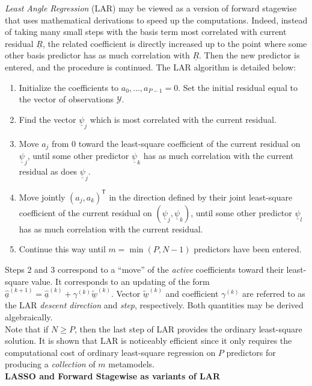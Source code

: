 {\emph{Least Angle Regression} (LAR) may be viewed as a version of forward stagewise that uses mathematical derivations to speed up the computations. Indeed, instead of taking many small steps with the basis term most correlated with current residual $\underline{R}$, the related coefficient is directly increased up to the point where some other basis predictor has as much correlation with $\underline{R}$. Then the new predictor is entered, and the procedure is continued. The LAR algorithm is detailed below:
\begin{enumerate}
	\item Initialize the coefficients to $a_{0},\dots,a_{P-1} = 0$. Set the initial residual equal to the vector of observations $\mathcal{Y}$. 
	\item Find the vector $\underline{\psi}_{j}$ which is most correlated with the current residual.
	\item Move $a_{j}$ from 0 toward the least-square coefficient of the current residual on $\underline{\psi}_{j}$, until some other predictor $\underline{\psi}_{k}$ has as much correlation with the current residual as does $\underline{\psi}_{j}$.
	\item Move jointly $(a_{j} , a_{k})^{\textsf{T}}$ in the direction defined by their joint least-square coefficient of the current residual on $(\underline{\psi}_{j},\underline{\psi}_{k})$, until some other predictor $\underline{\psi}_{l}$ has as much correlation with the current residual. 
	\item Continue this way until $m = \min(P,N-1)$ predictors have been entered. 
\end{enumerate}   
Steps 2 and 3 correspond to a ``move'' of the \emph{active} coefficients toward their least-square value. It corresponds to an updating of the form $\hat{\underline{a}}^{(k+1)} = \hat{\underline{a}}^{(k)} + \gamma^{(k)} \tilde{\underline{w}}^{(k)}$. Vector $\tilde{\underline{w}}^{(k)}$ and coefficient $\gamma^{(k)}$ are referred to as the LAR \emph{descent direction} and \emph{step}, respectively. Both quantities may be derived algebraically. \\

Note that if $N \geq P$, then the last step of LAR provides the ordinary least-square solution. It is shown that LAR is noticeably efficient since it only requires the computational cost of ordinary least-square regression on $P$ predictors for producing a \emph{collection} of $m$ metamodels. \\

\textbf{LASSO and Forward Stagewise as variants of LAR} \vspace{2mm}

}
